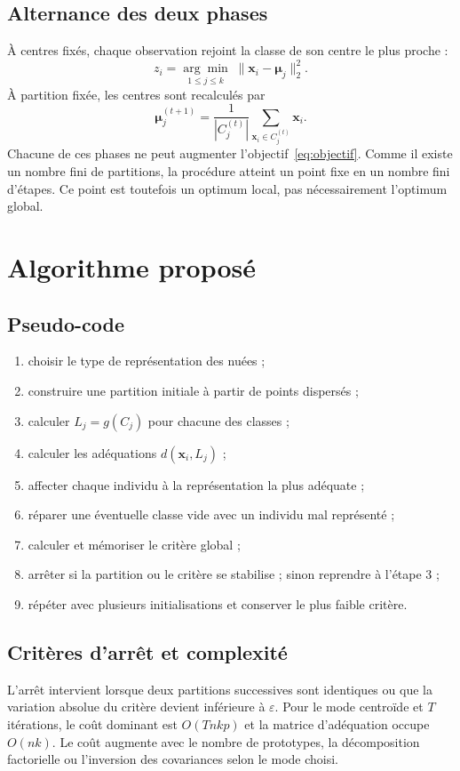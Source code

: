 \documentclass[12pt,a4paper]{article}
\begin{document}
\subsection{Alternance des deux phases}
À centres fixés, chaque observation rejoint la classe de son centre le plus
proche :
\begin{equation}\label{eq:affectation}
 z_i=\underset{1\leq j\leq k}{\arg\min}\;
 \|\mathbf{x}_i-\boldsymbol{\mu}_j\|_2^2.
\end{equation}
À partition fixée, les centres sont recalculés par
\begin{equation}\label{eq:maj}
 \boldsymbol{\mu}_j^{(t+1)}=\frac{1}{|C_j^{(t)}|}
 \sum_{\mathbf{x}_i\in C_j^{(t)}}\mathbf{x}_i.
\end{equation}
Chacune de ces phases ne peut augmenter l'objectif~\eqref{eq:objectif}. Comme
il existe un nombre fini de partitions, la procédure atteint un point fixe en
un nombre fini d'étapes. Ce point est toutefois un optimum local, pas
nécessairement l'optimum global.

\section{Algorithme proposé}
\subsection{Pseudo-code}
\begin{enumerate}
  \item choisir le type de représentation des nuées ;
  \item construire une partition initiale à partir de points dispersés ;
  \item calculer $L_j=g(C_j)$ pour chacune des classes ;
  \item calculer les adéquations $d(\mathbf{x}_i,L_j)$ ;
  \item affecter chaque individu à la représentation la plus adéquate ;
  \item réparer une éventuelle classe vide avec un individu mal représenté ;
  \item calculer et mémoriser le critère global ;
  \item arrêter si la partition ou le critère se stabilise ; sinon reprendre
        à l'étape 3 ;
  \item répéter avec plusieurs initialisations et conserver le plus faible critère.
\end{enumerate}

\subsection{Critères d'arrêt et complexité}
L'arrêt intervient lorsque deux partitions successives sont identiques ou que
la variation absolue du critère devient inférieure à $\varepsilon$. Pour le
mode centroïde et $T$ itérations, le coût dominant est $O(Tnkp)$ et la matrice
d'adéquation occupe $O(nk)$. Le coût augmente avec le nombre de prototypes, la
décomposition factorielle ou l'inversion des covariances selon le mode choisi.
\end{document}
